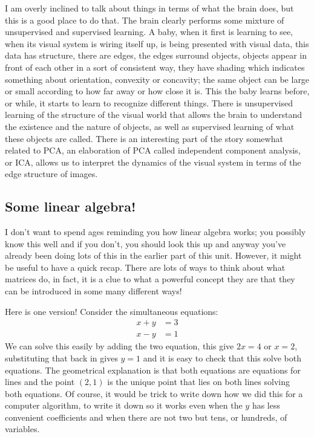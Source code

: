 \documentclass[12pt]{article}
\begin{document}
I am overly inclined to talk about things in terms of what the brain
does, but this is a good place to do that. The brain clearly performs
some mixture of unsupervised and supervised learning. A baby, when it
first is learning to see, when its visual system is wiring itself up,
is being presented with visual data, this data has structure, there
are edges, the edges surround objects, objects appear in front of each
other in a sort of consistent way, they have shading which indicates
something about orientation, convexity or concavity; the same object
can be large or small according to how far away or how close it
is. This the baby learns before, or while, it starts to learn to
recognize different things. There is unsupervised learning of the
structure of the visual world that allows the brain to understand the
existence and the nature of objects, as well as supervised learning of
what these objects are called. There is an interesting part of the
story somewhat related to PCA, an elaboration of PCA called
independent component analysis, or ICA, allows us to interpret the
dynamics of the visual system in terms of the edge structure of
images.

\subsection*{Some linear algebra!}

I don't want to spend ages reminding you how linear algebra works; you
possibly know this well and if you don't, you should look this up and
anyway you've already been doing lots of this in the earlier part of
this unit. However, it might be useful to have a quick recap. There
are lots of ways to think about what matrices do, in fact, it is a
clue to what a powerful concept they are that they can be introduced
in some many different ways!

Here is one version! Consider the simultaneous equations:
\begin{equation}
\begin{aligned}
x + y &= 3 \\
x - y &= 1
\end{aligned}
\end{equation}
We can solve this easily by adding the two equation, this give $2x=4$
or $x=2$, substituting that back in gives $y=1$ and it is easy to
check that this solve both equations. The geometrical explanation is
that both equations are equations for lines and the point $(2,1)$ is
the unique point that lies on both lines solving both equations. Of
course, it would be trick to write down how we did this for a computer
algorithm, to write it down so it works even when the $y$ has less
convenient coefficients and when there are not two but tens, or
hundreds, of variables.
\end{document}

